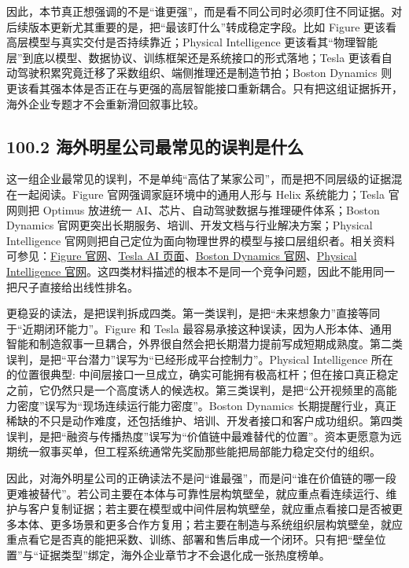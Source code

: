 因此，本节真正想强调的不是“谁更强”，而是看不同公司时必须盯住不同证据。对后续版本更新尤其重要的是，把“最该盯什么”转成稳定字段。比如 Figure 更该看高层模型与真实交付是否持续靠近；Physical Intelligence 更该看其“物理智能层”到底以模型、数据协议、训练框架还是系统接口的形式落地；Tesla 更该看自动驾驶积累究竟迁移了采数组织、端侧推理还是制造节拍；Boston Dynamics 则更该看其强本体是否正在与更强的高层智能接口重新耦合。只有把这组证据拆开，海外企业专题才不会重新滑回叙事比较。

\subsection*{100.2 海外明星公司最常见的误判是什么}


这一组企业最常见的误判，不是单纯“高估了某家公司”，而是把不同层级的证据混在一起阅读。Figure 官网强调家庭环境中的通用人形与 Helix 系统能力；Tesla 官网则把 Optimus 放进统一 AI、芯片、自动驾驶数据与推理硬件体系；Boston Dynamics 官网更突出长期服务、培训、开发文档与行业解决方案；Physical Intelligence 官网则把自己定位为面向物理世界的模型与接口层组织者。相关资料可参见：\href{https://www.figure.ai/}{Figure 官网}、\href{https://www.tesla.com/AI}{Tesla AI 页面}、\href{https://bostondynamics.com/}{Boston Dynamics 官网}、\href{https://www.physicalintelligence.company/}{Physical Intelligence 官网}。这四类材料描述的根本不是同一个竞争问题，因此不能用同一把尺子直接给出线性排名。

更稳妥的读法，是把误判拆成四类。第一类误判，是把“未来想象力”直接等同于“近期闭环能力”。Figure 和 Tesla 最容易承接这种误读，因为人形本体、通用智能和制造叙事一旦耦合，外界很自然会把长期潜力提前写成短期成熟度。第二类误判，是把“平台潜力”误写为“已经形成平台控制力”。Physical Intelligence 所在的位置很典型: 中间层接口一旦成立，确实可能拥有极高杠杆；但在接口真正稳定之前，它仍然只是一个高度诱人的候选权。第三类误判，是把“公开视频里的高能力密度”误写为“现场连续运行能力密度”。Boston Dynamics 长期提醒行业，真正稀缺的不只是动作难度，还包括维护、培训、开发者接口和客户成功组织。第四类误判，是把“融资与传播热度”误写为“价值链中最难替代的位置”。资本更愿意为远期统一叙事买单，但工程系统通常先奖励那些能把局部能力稳定交付的组织。

因此，对海外明星公司的正确读法不是问“谁最强”，而是问“谁在价值链的哪一段更难被替代”。若公司主要在本体与可靠性层构筑壁垒，就应重点看连续运行、维护与客户复制证据；若主要在模型或中间件层构筑壁垒，就应重点看接口是否被更多本体、更多场景和更多合作方复用；若主要在制造与系统组织层构筑壁垒，就应重点看它是否真的能把采数、训练、部署和售后串成一个闭环。只有把“壁垒位置”与“证据类型”绑定，海外企业章节才不会退化成一张热度榜单。


